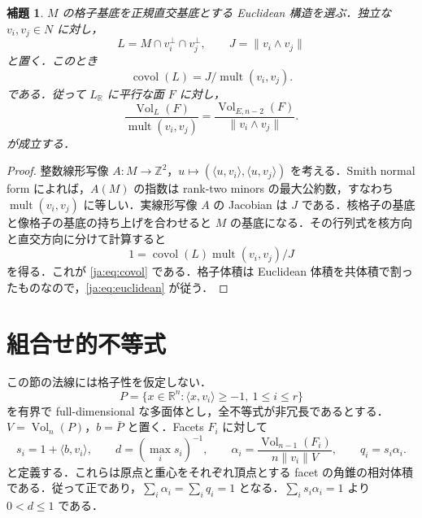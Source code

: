 \documentclass[12pt]{amsart}
\theoremstyle{definition}
\theoremstyle{remark}
\numberwithin{equation}{section}
\theoremstyle{plain}
\newtheorem{jlem}[thm]{補題}
\theoremstyle{definition}
\theoremstyle{remark}
\begin{document}
\begin{jlem}\label{ja:lem:lattice}
$M$ の格子基底を正規直交基底とする Euclidean 構造を選ぶ．独立な $v_i,v_j\in N$ に対し，
\[
L=M\cap v_i^\perp\cap v_j^\perp,\qquad J=\|v_i\wedge v_j\|
\]
と置く．このとき
\begin{equation}\label{ja:eq:covol}
 \operatorname{covol}(L)=J/\operatorname{mult}(v_i,v_j).
\end{equation}
である．従って $L_{\mathbb R}$ に平行な面 $F$ に対し，
\begin{equation}\label{ja:eq:euclidean}
 \frac{\operatorname{Vol}_{L}(F)}{\operatorname{mult}(v_i,v_j)}
 =\frac{\operatorname{Vol}_{E,n-2}(F)}{\|v_i\wedge v_j\|}.
\end{equation}
が成立する．
\end{jlem}
\begin{proof}
整数線形写像 $A:M\to\mathbb Z^2$，$u\mapsto(\langle u,v_i\rangle,\langle u,v_j\rangle)$ を考える．Smith normal form によれば，$A(M)$ の指数は rank-two minors の最大公約数，すなわち $\operatorname{mult}(v_i,v_j)$ に等しい．実線形写像 $A$ の Jacobian は $J$ である．核格子の基底と像格子の基底の持ち上げを合わせると $M$ の基底になる．その行列式を核方向と直交方向に分けて計算すると
\[
1=\operatorname{covol}(L)\operatorname{mult}(v_i,v_j)/J
\]
を得る．これが \eqref{ja:eq:covol} である．格子体積は Euclidean 体積を共体積で割ったものなので，\eqref{ja:eq:euclidean} が従う．
\end{proof}

\section{組合せ的不等式}\label{ja:sec:convex}
この節の法線には格子性を仮定しない．
\begin{equation}\label{ja:eq:real-polytope}
 P=\{x\in\mathbb R^n:\langle x,v_i\rangle\ge-1,\ 1\le i\le r\}
\end{equation}
を有界で full-dimensional な多面体とし，全不等式が非冗長であるとする．$V=\operatorname{Vol}_n(P)$，$b=\bar P$ と置く．Facets $F_i$ に対して
\begin{equation}\label{ja:eq:weights}
 s_i=1+\langle b,v_i\rangle,\qquad
 d=(\max_i s_i)^{-1},\qquad
 \alpha_i=\frac{\operatorname{Vol}_{n-1}(F_i)}{n\|v_i\|V},
 \qquad q_i=s_i\alpha_i.
\end{equation}
と定義する．これらは原点と重心をそれぞれ頂点とする facet の角錐の相対体積である．従って正であり，$\sum_i\alpha_i=\sum_iq_i=1$ となる．$\sum_i s_i\alpha_i=1$ より $0<d\le1$ である．
\end{document}
